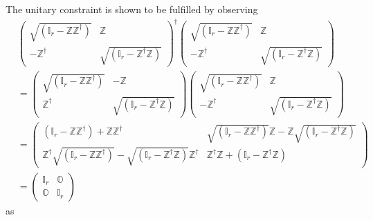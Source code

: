 \documentclass[aps, preprint]{revtex4}
\begin{document}
The unitary constraint is shown to be fulfilled by observing
\begin{align} & \left (\begin{array}{cc}\sqrt{\left (\mathbb{I}_{r} -\mathbb{Z} \mathbb{Z}^{ \dag }\right )} & \mathbb{Z} \\
 -\mathbb{Z}^{ \dag } & \sqrt{\left (\mathbb{I}_{r} -\mathbb{Z}^{ \dag } \mathbb{Z}\right )}\end{array}\right )^{ \dag } \left (\begin{array}{cc}\sqrt{\left (\mathbb{I}_{r} -\mathbb{Z} \mathbb{Z}^{ \dag }\right )} & \mathbb{Z} \\
 -\mathbb{Z}^{ \dag } & \sqrt{\left (\mathbb{I}_{r} -\mathbb{Z}^{ \dag } \mathbb{Z}\right )}\end{array}\right ) \\
 &  =\left (\begin{array}{cc}\sqrt{\left (\mathbb{I}_{r} -\mathbb{Z} \mathbb{Z}^{ \dag }\right )} &  -\mathbb{Z} \\
\mathbb{Z}^{ \dag } & \sqrt{\left (\mathbb{I}_{r} -\mathbb{Z}^{ \dag } \mathbb{Z}\right )}\end{array}\right ) \left (\begin{array}{cc}\sqrt{\left (\mathbb{I}_{r} -\mathbb{Z} \mathbb{Z}^{ \dag }\right )} & \mathbb{Z} \\
 -\mathbb{Z}^{ \dag } & \sqrt{\left (\mathbb{I}_{r} -\mathbb{Z}^{ \dag } \mathbb{Z}\right )}\end{array}\right ) \\
 &  =\left (\begin{array}{cc}\left (\mathbb{I}_{r} -\mathbb{Z} \mathbb{Z}^{ \dag }\right ) +\mathbb{Z} \mathbb{Z}^{ \dag } & \sqrt{\left (\mathbb{I}_{r} -\mathbb{Z} \mathbb{Z}^{ \dag }\right )} \mathbb{Z} -\mathbb{Z} \sqrt{\left (\mathbb{I}_{r} -\mathbb{Z}^{ \dag } \mathbb{Z}\right )} \\
\mathbb{Z}^{ \dag } \sqrt{\left (\mathbb{I}_{r} -\mathbb{Z} \mathbb{Z}^{ \dag }\right )} -\sqrt{\left (\mathbb{I}_{r} -\mathbb{Z}^{ \dag } \mathbb{Z}\right )} \mathbb{Z}^{ \dag } & \mathbb{Z}^{ \dag } \mathbb{Z} +\left (\mathbb{I}_{r} -\mathbb{Z}^{ \dag } \mathbb{Z}\right )\end{array}\right ) \\
 &  =\left (\begin{array}{cc}\mathbb{I}_{r} & \mathbb{O} \\
\mathbb{O} & \mathbb{I}_{r}\end{array}\right )\end{align}as
\end{document}
